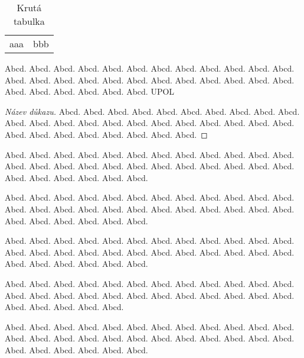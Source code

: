 \documentclass[12pt]{article}
\begin{document}
\begin{table}
\begin{tabular}{c | c}
aaa & bbb 
\end{tabular}
\caption{Krutá tabulka}
\end{table}



\begin{definition}
Abcd. Abcd. Abcd. Abcd. Abcd. Abcd. Abcd. Abcd. Abcd. Abcd. Abcd. Abcd. Abcd. Abcd. Abcd. Abcd. Abcd. Abcd. Abcd. Abcd. Abcd. Abcd. Abcd. Abcd. Abcd. Abcd. Abcd. Abcd. Abcd. Abcd. \gls{UPOL}
\end{definition}

\begin{proof}[Název důkazu]
Abcd. Abcd. Abcd. Abcd. Abcd. Abcd. Abcd. Abcd. Abcd. Abcd. Abcd. Abcd. Abcd. Abcd. Abcd. Abcd. Abcd. Abcd. Abcd. Abcd. Abcd. Abcd. Abcd. Abcd. Abcd. Abcd. Abcd. Abcd. Abcd. Abcd. 
\end{proof}

\begin{remark}
Abcd. Abcd. Abcd. Abcd. Abcd. Abcd. Abcd. Abcd. Abcd. Abcd. Abcd. Abcd. Abcd. Abcd. Abcd. Abcd. Abcd. Abcd. Abcd. Abcd. Abcd. Abcd. Abcd. Abcd. Abcd. Abcd. Abcd. Abcd. Abcd. Abcd. 
\end{remark}

\begin{example}
Abcd. Abcd. Abcd. Abcd. Abcd. Abcd. Abcd. Abcd. Abcd. Abcd. Abcd. Abcd. Abcd. Abcd. Abcd. Abcd. Abcd. Abcd. Abcd. Abcd. Abcd. Abcd. Abcd. Abcd. Abcd. Abcd. Abcd. Abcd. Abcd. Abcd. 
\end{example}

\begin{lemma}
Abcd. Abcd. Abcd. Abcd. Abcd. Abcd. Abcd. Abcd. Abcd. Abcd. Abcd. Abcd. Abcd. Abcd. Abcd. Abcd. Abcd. Abcd. Abcd. Abcd. Abcd. Abcd. Abcd. Abcd. Abcd. Abcd. Abcd. Abcd. Abcd. Abcd. 
\end{lemma}

\begin{consequence}
Abcd. Abcd. Abcd. Abcd. Abcd. Abcd. Abcd. Abcd. Abcd. Abcd. Abcd. Abcd. Abcd. Abcd. Abcd. Abcd. Abcd. Abcd. Abcd. Abcd. Abcd. Abcd. Abcd. Abcd. Abcd. Abcd. Abcd. Abcd. Abcd. 
\end{consequence}

\begin{theorem}
Abcd. Abcd. Abcd. Abcd. Abcd. Abcd. Abcd. Abcd. Abcd. Abcd. Abcd. Abcd. Abcd. Abcd. Abcd. Abcd. Abcd. Abcd. Abcd. Abcd. Abcd. Abcd. Abcd. Abcd. Abcd. Abcd. Abcd. Abcd. Abcd. Abcd. 
\end{theorem}
\end{document}
